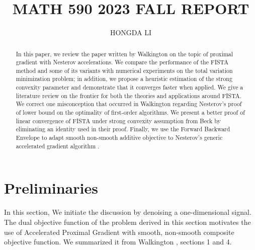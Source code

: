 \documentclass[]{article}
\title{MATH 590 2023 FALL REPORT}
\author{HONGDA LI}
\theoremstyle{definition}
\numberwithin{equation}{subsection}
\begin{document}
\maketitle

\begin{abstract}
    In this paper, we review the paper written by Walkington \cite{noel_nesterovs_nodate} on the topic of proximal gradient with Nesterov accelerations. 
    We compare the performance of the FISTA method and some of its variants with numerical experiments on the total variation minimization problem; in addition, we propose a heuristic estimation of the strong convexity parameter and demonstrate that it converges faster when applied. 
    We give a literature review on the frontier for both the theories and applications around FISTA. 
    We correct one misconception that occurred in Walkington \cite{noel_nesterovs_nodate} regarding Nesterov's proof of lower bound on the optimality of first-order algorithms.  
    We present a better proof of linear convergence of FISTA under strong convexity assumption from Beck \cite[theorem 10.7.7]{beck_first-order_nodate} by eliminating an identity used in their proof. 
    Finally, we use the Forward Backward Envelope to adapt smooth non-smooth additive objective to Nesterov's generic accelerated gradient algorithm \cite[2.2.7]{nesterov_lecture_2018}. 
\end{abstract}


\section{Preliminaries}\label{sec:preliminaries}
    In this section, We initiate the discussion by denoising a one-dimensional signal. 
    The dual objective function of the problem derived in this section motivates the use of Accelerated Proximal Gradient with smooth, non-smooth composite objective function.
    We summarized it from Walkington \cite{noel_nesterovs_nodate}, sections 1 and 4. 
\end{document}
